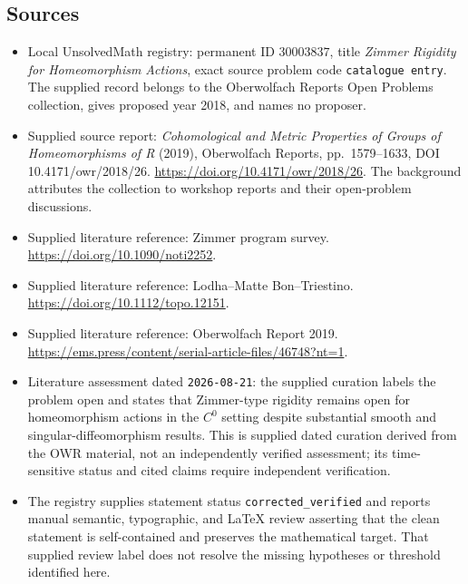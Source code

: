 \documentclass[11pt]{article}
\begin{document}
\subsection{Sources}
\begin{itemize}
\item Local UnsolvedMath registry: permanent ID \(30003837\), title \emph{Zimmer Rigidity for Homeomorphism Actions}, exact source problem code \texttt{catalogue entry}. The supplied record belongs to the Oberwolfach Reports Open Problems collection, gives proposed year 2018, and names no proposer.
\item Supplied source report: \emph{Cohomological and Metric Properties of Groups of Homeomorphisms of R} (2019), Oberwolfach Reports, pp.~1579--1633, DOI 10.4171/owr/2018/26. \url{https://doi.org/10.4171/owr/2018/26}. The background attributes the collection to workshop reports and their open-problem discussions.
\item Supplied literature reference: Zimmer program survey. \url{https://doi.org/10.1090/noti2252}.
\item Supplied literature reference: Lodha--Matte Bon--Triestino. \url{https://doi.org/10.1112/topo.12151}.
\item Supplied literature reference: Oberwolfach Report 2019. \url{https://ems.press/content/serial-article-files/46748?nt=1}.
\item Literature assessment dated \texttt{2026-08-21}: the supplied curation labels the problem open and states that Zimmer-type rigidity remains open for homeomorphism actions in the \(C^0\) setting despite substantial smooth and singular-diffeomorphism results. This is supplied dated curation derived from the OWR material, not an independently verified assessment; its time-sensitive status and cited claims require independent verification.
\item The registry supplies statement status \texttt{corrected\_verified} and reports manual semantic, typographic, and LaTeX review asserting that the clean statement is self-contained and preserves the mathematical target. That supplied review label does not resolve the missing hypotheses or threshold identified here.
\end{itemize}
\end{document}
